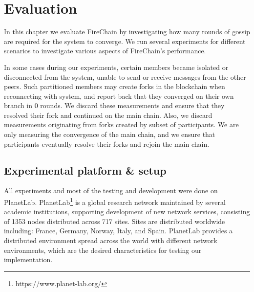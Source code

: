 \documentclass[USenglish]{uit-thesis}
\begin{document}
 


  






  
\chapter{Evaluation}\label{chap:evaluation}
In this chapter we evaluate FireChain by investigating how many rounds of gossip are required for the system to converge.
We run several experiments for different scenarios to investigate various aspects of FireChain's performance.

In some cases during our experiments, certain members became isolated or disconnected from the system, unable to send or receive messages from the other peers.
Such partitioned members may create forks in the blockchain when reconnecting with system, and report back that they converged on their own branch in 0 rounds.
We discard these measurements and ensure that they resolved their fork and continued on the main chain.
Also, we discard measurements originating from forks created by subset of participants.
We are only measuring the convergence of the main chain, and we ensure that participants eventually resolve their forks and rejoin the main chain. 


\section{Experimental platform \& setup}
All experiments and most of the testing and development were done on PlanetLab. 
PlanetLab\footnote{https://www.planet-lab.org/} is a global research network maintained by several academic institutions, supporting development of new network services, consisting of 1353 nodes distributed across 717 sites.
Sites are distributed worldwide including: France, Germany, Norway, Italy, and Spain. 
PlanetLab provides a distributed environment spread across the world with different network environments, which are the desired characteristics for testing our implementation.
\end{document}
